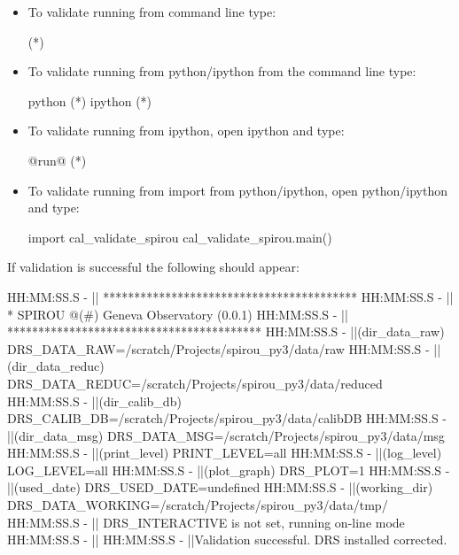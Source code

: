 \begin{itemize}

\item To validate running from command line type:
\begin{cmdbox}
(*\calvalidate*)
\end{cmdbox}

\item To validate running from python/ipython from the command line type:
\begin{cmdbox}
python (*\calvalidate*)
ipython (*\calvalidate*)
\end{cmdbox}

\item To validate running from ipython, open ipython and type:
\begin{pythonbox}
@run@ (*\calvalidate*)
\end{pythonbox}

\item To validate running from import from python/ipython, open python/ipython and type:
\begin{pythonbox}
import cal_validate_spirou
cal_validate_spirou.main()
\end{pythonbox}

\end{itemize}

\noindent If validation is successful the following should appear:

\begin{cmdboxprint}
HH:MM:SS.S -   || *****************************************
HH:MM:SS.S -   || * SPIROU @(#) Geneva Observatory (0.0.1)
HH:MM:SS.S -   || *****************************************
HH:MM:SS.S -   ||(dir_data_raw)      DRS_DATA_RAW=/scratch/Projects/spirou_py3/data/raw
HH:MM:SS.S -   ||(dir_data_reduc)    DRS_DATA_REDUC=/scratch/Projects/spirou_py3/data/reduced
HH:MM:SS.S -   ||(dir_calib_db)      DRS_CALIB_DB=/scratch/Projects/spirou_py3/data/calibDB
HH:MM:SS.S -   ||(dir_data_msg)      DRS_DATA_MSG=/scratch/Projects/spirou_py3/data/msg
HH:MM:SS.S -   ||(print_level)       PRINT_LEVEL=all         %
HH:MM:SS.S -   ||(log_level)         LOG_LEVEL=all         %
HH:MM:SS.S -   ||(plot_graph)        DRS_PLOT=1            %
HH:MM:SS.S -   ||(used_date)         DRS_USED_DATE=undefined
HH:MM:SS.S -   ||(working_dir)       DRS_DATA_WORKING=/scratch/Projects/spirou_py3/data/tmp/
HH:MM:SS.S -   ||                    DRS_INTERACTIVE is not set, running on-line mode
HH:MM:SS.S -   ||
HH:MM:SS.S -   ||Validation successful. DRS installed corrected.
\end{cmdboxprint}

